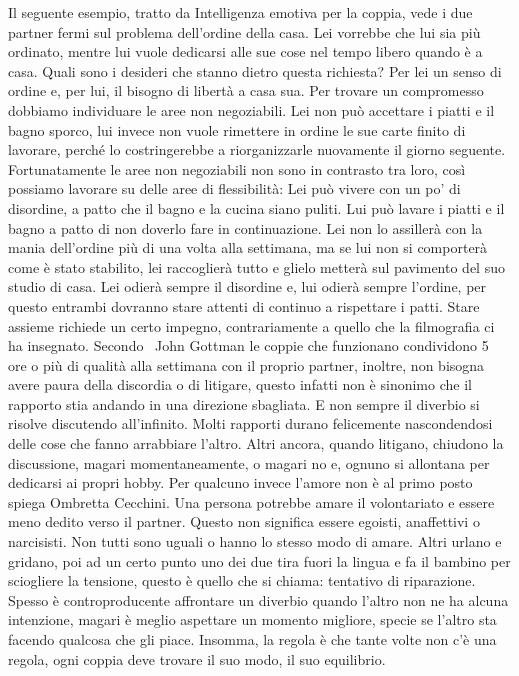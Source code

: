 \documentclass[12pt]{book} %
\begin{document}
Il seguente esempio, tratto da Intelligenza emotiva per la coppia, vede i
due partner fermi sul problema dell'ordine della casa. Lei vorrebbe che lui sia più ordinato,
mentre lui vuole dedicarsi alle sue cose nel tempo libero quando è a casa. Quali sono i desideri che stanno dietro
questa richiesta? Per lei un senso di ordine e, per lui, il bisogno di libertà a casa sua. Per trovare un compromesso
dobbiamo individuare le aree non negoziabili. Lei non può accettare i piatti e il bagno sporco, lui invece non vuole
rimettere in ordine le sue carte finito di lavorare, perché lo costringerebbe a riorganizzarle nuovamente il giorno
seguente. Fortunatamente le aree non negoziabili non sono in contrasto tra loro, così possiamo lavorare su delle aree
di flessibilità: Lei può vivere con un po' di disordine, a patto che il bagno e la cucina siano
puliti. Lui può lavare i piatti e il bagno a patto di non doverlo fare in continuazione. Lei non lo assillerà con la
mania dell'ordine più di una volta alla settimana, ma se lui non si comporterà come è stato
stabilito, lei raccoglierà tutto e glielo metterà sul pavimento del suo studio di casa. Lei odierà sempre il disordine
e, lui odierà sempre l'ordine, per questo entrambi dovranno stare attenti di continuo a rispettare
i patti. Stare assieme richiede un certo impegno, contrariamente a quello che la filmografia ci ha insegnato. Secondo
\ John Gottman le coppie che funzionano condividono 5 ore o più di qualità alla settimana con il proprio partner,
inoltre, non bisogna avere paura della discordia o di litigare, questo infatti non è sinonimo che il rapporto stia
andando in una direzione sbagliata. E non sempre il diverbio si risolve discutendo all'infinito.
Molti rapporti durano felicemente nascondendosi delle cose che fanno arrabbiare l'altro. Altri
ancora, quando litigano, chiudono la discussione, magari momentaneamente, o magari no e, ognuno si allontana per
dedicarsi ai propri hobby. Per qualcuno invece l'amore non è al primo posto spiega Ombretta
Cecchini. Una persona
potrebbe amare il volontariato e essere meno dedito verso il partner. Questo non significa essere egoisti, anaffettivi
o narcisisti. Non tutti sono uguali o hanno lo stesso modo di amare. Altri urlano e gridano, poi ad un certo punto uno
dei due tira fuori la lingua e fa il bambino per sciogliere la tensione, questo è quello che si chiama: tentativo di
riparazione. Spesso è controproducente affrontare un diverbio quando l'altro non ne ha alcuna
intenzione, magari è meglio aspettare un momento migliore, specie se l'altro sta facendo qualcosa
che gli piace. Insomma, la regola è che tante volte non c'è una regola, ogni coppia deve trovare
il suo modo, il suo equilibrio. 
\end{document}
